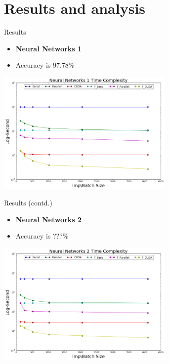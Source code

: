 \section{Results and analysis}
 \begin{frame}{Results}
     \begin{itemize}
         \item{ \textbf{Neural Networks 1}
         }
         \item { Accuracy is 97.78\%} 
     \end{itemize}
     
		\begin{center}
		\includegraphics[width=3.4in]{nn1_time.png}
		\end{center}

 \end{frame}
 
\begin{frame}{Results (contd.)}
     \begin{itemize}
         \item{ \textbf{Neural Networks 2}
         }
         \item { Accuracy is ???\%} 
     \end{itemize}
     
		\begin{center}
		\includegraphics[width=3.4in]{nn2_time.png}
		\end{center}

 \end{frame} 

